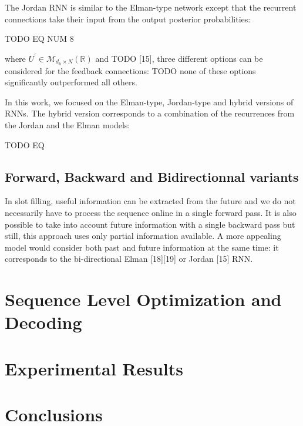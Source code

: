 The Jordan RNN is similar to the Elman-type network except that the recurrent
connections take their input from the output posterior probabilities:

TODO EQ NUM 8

where $U^{'}\in\mathcal{M}_{d_h\times N} (\mathbb{R})$ and
TODO %
[15], three different options can be considered for the feedback connections:
TODO %
none of these options significantly outperformed all others.  

In this work, we focused on the Elman-type, Jordan-type and hybrid versions of
RNNs. The hybrid version corresponds to a combination of the recurrences from
the Jordan and the Elman models:

TODO EQ

\subsection{Forward, Backward and Bidirectionnal variants}

In slot filling, useful information can be extracted from the future and we do
not necessarily have to process the sequence online in a single forward pass.
It is also possible to take into account future information with a single
backward pass but still, this approach uses only partial information available.
A more appealing model would consider both past and future information at the
same time: it corresponds to the bi-directional Elman [18][19] or Jordan [15]
RNN.




\section{Sequence Level Optimization and Decoding} \label{sec:slod}

\section{Experimental Results}
\label{sec:exp}

\section{Conclusions}
\label{sec:conclu}
